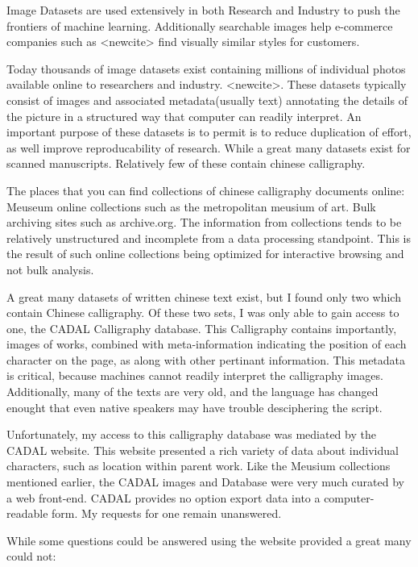 
Image Datasets are used extensively in both Research and Industry to push the frontiers of machine learning.  Additionally searchable images help e-commerce companies such as <newcite> find visually similar styles for customers.

Today thousands of image datasets exist containing millions of individual photos available online to researchers and industry.  <newcite>.  These datasets typically consist of images and associated metadata(usually text) annotating the details of the picture in a structured way that computer can readily interpret.  An important purpose of these datasets is to permit is to reduce duplication of effort, as well improve reproducability of research.  While a great many datasets exist for scanned manuscripts.  Relatively few of these contain chinese calligraphy.

The places that you can find collections of chinese calligraphy documents online:  Meuseum online collections such as the metropolitan meusium of art.  Bulk archiving sites such as archive.org.  The information from collections tends to be relatively unstructured and incomplete from a data processing standpoint.  This is the result of such online collections being optimized for interactive browsing and not bulk analysis.

A great many datasets of written chinese text exist, but I found only two which contain Chinese calligraphy.  Of these two sets, I was only able to gain access to one, the CADAL Calligraphy database.  This Calligraphy contains importantly, images of works, combined with meta-information indicating the position of each character on the page, as along with other pertinant information.  This metadata is critical, because machines cannot readily interpret the calligraphy images.  Additionally, many of the texts are very old, and the language has changed enought that even native speakers may have trouble desciphering the script.

Unfortunately, my access to this calligraphy database was mediated by the CADAL website.  This website presented a rich variety of data about individual characters, such as location within parent work.  Like the Meusium collections mentioned earlier, the CADAL images and Database were very much curated by a web front-end.  CADAL provides no option export data into a computer-readable form.  My requests for one remain unanswered.

While some questions could be answered using the website provided a great many could not:

